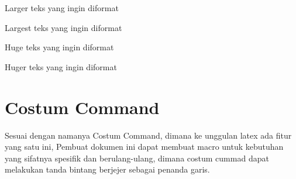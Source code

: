 Larger
{\Large teks yang ingin diformat }

Largest
{\LARGE teks yang ingin diformat }

Huge
{\huge teks yang ingin diformat }

Huger
{\Huge teks yang ingin diformat }

\section{Costum Command}
Sesuai  dengan  namanya Costum Command, dimana ke unggulan latex ada fitur yang satu ini,
Pembuat dokumen ini dapat  membuat macro untuk kebutuhan yang sifatnya spesifik dan berulang-ulang,
dimana costum cummad dapat melakukan tanda bintang berjejer sebagai penanda garis.



